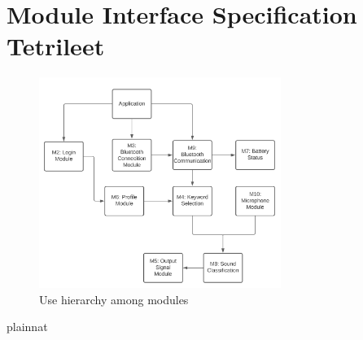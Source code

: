 \documentclass[12pt, titlepage]{article}
\begin{document}
\section{Module Interface Specification Tetrileet}



\begin{figure}[H]
\centering
\includegraphics[width=0.7\textwidth]{UsesHierarchy.png}
\caption{Use hierarchy among modules}
\label{FigUH}
\end{figure}




 {plainnat}


\newpage{}
\end{document}
